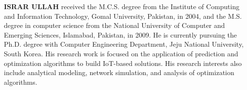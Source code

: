 \documentclass{ieeeaccess}
\begin{document}
\begin{IEEEbiography}{\textbf{ISRAR ULLAH}} received the M.C.S. degree from the Institute of Computing and Information Technology, Gomal University, Pakistan, in 2004, and the M.S. degree in computer science from the National University of Computer and Emerging Sciences, Islamabad, Pakistan, in 2009. He is currently pursuing the Ph.D. degree with Computer Engineering Department, Jeju National University, South Korea. His research work is focused on the application of prediction and optimization algorithms to build IoT-based solutions. His research interests also include analytical modeling, network simulation, and analysis of optimization algorithms.
\end{IEEEbiography}


\EOD
\end{document}
